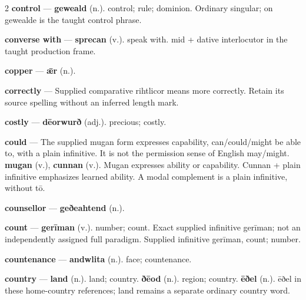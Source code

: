 \begin{multicols}{2}
\textbf{control} — \textbf{geweald} (n.). control; rule; dominion. Ordinary singular; on gewealde is the taught control phrase.\par
\textbf{converse with} — \textbf{sprecan} (v.). speak with. mid + dative interlocutor in the taught production frame.\par
\textbf{copper} — \textbf{ǣr} (n.).\par
\textbf{correctly} — Supplied comparative rihtlicor means more correctly. Retain its source spelling without an inferred length mark.\par
\textbf{costly} — \textbf{dēorwurð} (adj.). precious; costly.\par
\textbf{could} — The supplied mugan form expresses capability, can/could/might be able to, with a plain infinitive. It is not the permission sense of English may/might. \textbf{mugan} (v.), \textbf{cunnan} (v.). Mugan expresses ability or capability. Cunnan + plain infinitive emphasizes learned ability. A modal complement is a plain infinitive, without tō.\par
\textbf{counsellor} — \textbf{geðeahtend} (n.).\par
\textbf{count} — \textbf{gerīman} (v.). number; count. Exact supplied infinitive gerīman; not an independently assigned full paradigm. Supplied infinitive gerīman, count; number.\par
\textbf{countenance} — \textbf{andwlita} (n.). face; countenance.\par
\textbf{country} — \textbf{land} (n.). land; country. \textbf{ðēod} (n.). region; country. \textbf{ēðel} (n.). ēðel in these home-country references; land remains a separate ordinary country word.\par

\end{multicols}
